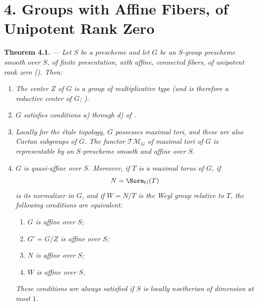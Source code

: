 
%
\section*{4. Groups with Affine Fibers, of Unipotent Rank Zero}

\noindent{}%
\textbf{Theorem 4.1.} --- \textit{Let \(S\) be a prescheme and
let \(G\) be an \(S\)-group prescheme smooth over \(S\), of finite
presentation, with affine, connected fibers, of unipotent rank
zero (). Then:}

\begin{enumerate}
\renewcommand{\labelenumi}{\textit{\alph{enumi})}}
\item \textit{The center \(Z\) of \(G\) is a group of
multiplicative type (and is therefore a reductive center of \(G\);
).}

\item \textit{\(G\) satisfies conditions a) through d) of .}

\item \textit{Locally for the étale topology, \(G\) possesses
maximal tori, and these are also Cartan subgroups of \(G\). The
functor \(\mathscr{TM}_G\) of maximal tori of \(G\) is
representable by an \(S\)-prescheme smooth and affine over \(S\).}

\item \textit{\(G\) is quasi-affine over \(S\). Moreover, if
\(T\) is a maximal torus of \(G\), if}
\[
  N=\Norm_G(T)
\]
\textit{is its normalizer in \(G\), and if \(W=N/T\) is the Weyl
group relative to \(T\), the following conditions are equivalent:}
\begin{enumerate}
\renewcommand{\labelenumii}{\textit{(\roman{enumii})}}
\item \textit{\(G\) is affine over \(S\);}
\item \textit{\(G'=G/Z\) is affine over \(S\);}
\item \textit{\(N\) is affine over \(S\);}
\item \textit{\(W\) is affine over \(S\).}
\end{enumerate}
\textit{These conditions are always satisfied if \(S\) is locally
noetherian of dimension at most \(1\).}
\end{enumerate}

